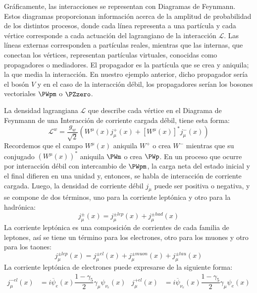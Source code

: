 Gráficamente, las interacciones se representan con Diagramas de Feynmann. Estos diagramas proporcionan información acerca de la amplitud de probabilidad de los distintos procesos, donde cada línea representa a una partícula y cada vértice corresponde a cada actuación del lagrangiano de la interacción $\mathcal{L}$. Las líneas externas corresponden a partículas reales, mientras que las internas, que conectan los vértices, representan partículas virtuales, conocidas como propagadores o mediadores. El propagador es la partícula que se crea y aniquila; la que media la interacción. \cite{notas2020} En nuestro ejemplo anterior, dicho propagador sería el bosón $V$ y en el caso de la interacción débil, los propagadores serían los bosones vectoriales $\PWpm$ o $\PZzero$.

La densidad lagrangiana $\mathcal{L}$ que describe cada vértice en el Diagrama de Feynmann de una Interacción de corriente cargada débil, tiene esta forma:
\begin{equation}
\mathcal{L}^{w}=\dfrac{g_{w}}{\sqrt{2}}\left( W^{\mu }\left( x\right) j_{\mu}^{+}\left( x\right) +\left[ W^{\mu }\left( x\right) \right]^{\ast }j_{\mu}^{-}\left( x\right) \right)\label{eq:weak_lagrangian}
\end{equation}
Recordemos que el campo $W^{\mu}(x)$ aniquila $W^{+}$ o crea $W^{-}$ mientras que su conjugado $\left(W^{\mu}(x)\right)^\ast$ aniquila $\PWm$ o crea $\PWp$. En un proceso que ocurre por interacción débil con intercambio de $\PWpm$, la carga neta del estado inicial y el final difieren en una unidad y, entonces, se habla de interacción de corriente cargada. Luego, la densidad de corriente débil $j_{\mu}$ puede ser positiva o negativa, y se compone de dos términos, uno para la corriente leptónica y otro para la hadrónica:
\begin{equation}
j_{\mu} ^{\pm }\left( x\right) =j_{\mu} ^{\pm lep}\left( x\right) +j_{\mu} ^{\pm had}\left( x\right) \label{eq:weak_current_hadylep}
\end{equation}
La corriente leptónica es una composición de corrientes de cada familia de leptones, así se tiene un término para los electrones, otro para los muones y otro para los taones:
\begin{equation}
j_{\mu }^{\pm lep}\left( x\right) =j_{\mu }^{\pm el}\left( x\right) +j_{\mu }^{\pm muon}\left( x\right) +j_{\mu} ^{\pm tau}\left( x\right)\label{eq:leptonic_weak_current}
\end{equation}
La corriente leptónica de electrones puede expresarse de la siguiente forma:
\begin{align}
j_{\mu }^{-el}\left(x\right)&=i\overline{\psi}_{e}\left( x\right) \dfrac{1-\gamma_{5}}{2}\gamma _{\mu }\psi_{{ \nu}_{e}}\left( x\right) & j_{\mu}^{+el}\left(x\right)&= i\overline{\psi}_{{\nu}_{e}}\left(x\right) \dfrac{1-\gamma_{5}}{2}\gamma _{\mu}\psi_{e}\left( x\right)\label{eq:electric_weak_current}
\end{align}
